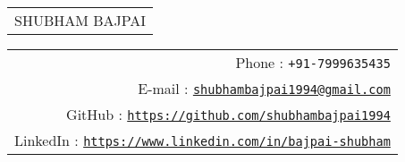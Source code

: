 \documentclass[10pt]{article}
\begin{document}
{\Huge\begin{tabular}[c]{c}
  SHUBHAM BAJPAI
\end{tabular}}\hfill%
{\small\begin{tabular}[c]{r}
  Phone : \texttt{+91-7999635435}\\
  E-mail : \href{mailto:shubhambajpai1994@gmail.com}{\texttt{shubhambajpai1994@gmail.com}}\\
  GitHub :
            \href{https://github.com/shubhambajpai1994}{\texttt{https://github.com/shubhambajpai1994}}\\
 LinkedIn : \href{https://www.linkedin.com/in/bajpai-shubham/}{\texttt{https://www.linkedin.com/in/bajpai-shubham}}
\end{tabular}}%



    
\end{document}
